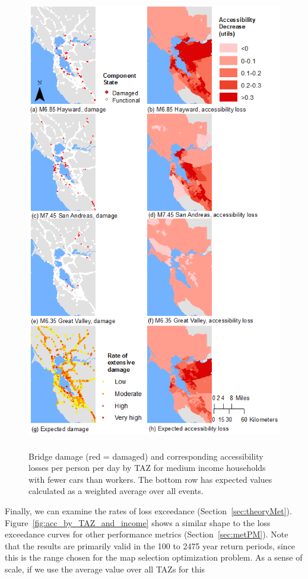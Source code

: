 \begin{figure}[t]
        \includegraphics[height=8in]{FIGS/accByEq.png}
    \caption{Bridge damage (red = damaged) and corresponding accessibility losses per person per day by TAZ for medium income households with fewer cars than workers. The bottom row has expected values calculated as a weighted average over all events.}
\label{fig:scen_acc}
\end{figure}


Finally, we can examine the rates of loss exceedance (Section~\ref{sec:theoryMet}). Figure~\ref{fig:acc_by_TAZ_and_income} shows a similar shape to the loss exceedance curves for other performance metrics (Section~\ref{sec:metPM}). Note that the results are primarily valid in the 100 to 2475 year return periods, since this is the range chosen for the map selection optimization problem. As a sense of scale, if we use the average value over all TAZs for this 

